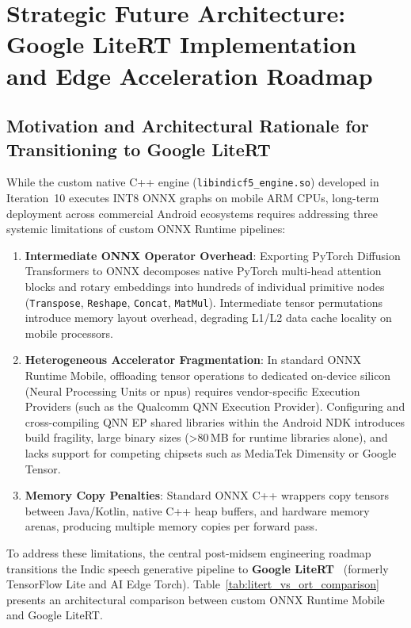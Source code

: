 \chapter{Strategic Future Architecture: Google LiteRT Implementation and Edge Acceleration Roadmap}
\label{Chapter5}

\section{Motivation and Architectural Rationale for Transitioning to Google LiteRT}
While the custom native C++ engine (\texttt{libindicf5\_engine.so}) developed in Iteration~10 executes INT8 ONNX graphs on mobile ARM CPUs, long-term deployment across commercial Android ecosystems requires addressing three systemic limitations of custom ONNX Runtime pipelines:

\begin{enumerate}
    \item \textbf{Intermediate ONNX Operator Overhead}: Exporting PyTorch Diffusion Transformers to ONNX decomposes native PyTorch multi-head attention blocks and rotary embeddings into hundreds of individual primitive nodes (\texttt{Transpose}, \texttt{Reshape}, \texttt{Concat}, \texttt{MatMul}). Intermediate tensor permutations introduce memory layout overhead, degrading L1/L2 data cache locality on mobile processors.
    
    \item \textbf{Heterogeneous Accelerator Fragmentation}: In standard ONNX Runtime Mobile, offloading tensor operations to dedicated on-device silicon (Neural Processing Units or \acrshort{npu}s) requires vendor-specific Execution Providers (such as the Qualcomm QNN Execution Provider). Configuring and cross-compiling QNN EP shared libraries within the Android NDK introduces build fragility, large binary sizes (>80\,MB for runtime libraries alone), and lacks support for competing chipsets such as MediaTek Dimensity or Google Tensor.
    
    \item \textbf{Memory Copy Penalties}: Standard ONNX C++ wrappers copy tensors between Java/Kotlin, native C++ heap buffers, and hardware memory arenas, producing multiple memory copies per forward pass.
\end{enumerate}

To address these limitations, the central post-midsem engineering roadmap transitions the Indic speech generative pipeline to \textbf{Google LiteRT}~\cite{google_litert2024} (formerly TensorFlow Lite and AI Edge Torch). Table~\ref{tab:litert_vs_ort_comparison} presents an architectural comparison between custom ONNX Runtime Mobile and Google LiteRT.


